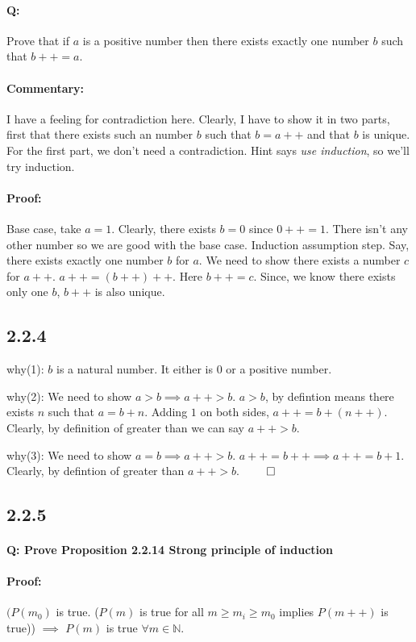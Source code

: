 \documentclass{report}
\begin{document}
\paragraph{Q:} Prove that if $a$ is a positive number then there exists exactly one number $b$ such that $b++ = a$. 
\paragraph{Commentary: } I have a feeling for contradiction here. Clearly, I have to show it in two parts, first that there exists such an number $b$ such that $b=a++$ and that $b$ is unique. For the first part, we don't need a contradiction. 
Hint says \textit{use induction}, so we'll try induction. 
\paragraph{Proof: } Base case, take $a=1$. Clearly, there exists  $b = 0$ since $0++=1$. There isn't any other number so we are good with the base case. Induction assumption step. Say, there exists exactly one  number  $b$ for  $a$. We need to show there exists a number $c$ for  $a++$.  $a++= \left( b++ \right) ++ $. Here $b++ =c $. Since, we know there exists only one  $b$,  $b++$ is also unique. 

\subsection*{2.2.4}
why(1): $b$ is a natural number. It either is $0$ or a positive number. 

why(2): We need to show  $a > b \implies a++ > b$.  $a>b$, by defintion means  there exists  $n$ such that $a=b+n$. Adding  $1$ on both sides, $a++= b+\left( n++ \right) $. Clearly, by definition of greater than we can say  $a++ > b$.

why(3): We need to show  $a=b \implies a++ > b$.  $a++=b++ \implies a++ = b+1$. Clearly, by defintion of greater than $a++ > b$. $\qed$  



\subsection*{2.2.5}
\paragraph{Q: Prove Proposition 2.2.14 Strong principle of induction}
\paragraph{Proof:}
$(P\left( m_0 \right)$ is true. ($P(m)$ is true for all  $m \ge m_i \ge m_0$ implies $P(m++)$ is true)) $\implies$  $P(m)$ is true $\forall m \in \mathbb{N}$.
\end{document}
